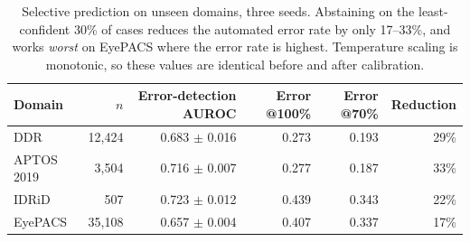 \begin{table}[t]
\centering
\caption{Selective prediction on unseen domains, three seeds. Abstaining on the least-confident 30\% of cases reduces the automated error rate by only 17--33\%, and works \emph{worst} on EyePACS where the error rate is highest. Temperature scaling is monotonic, so these values are identical before and after calibration.}
\label{tab:selective}
\begin{tabular}{lrrrrr}
\toprule
Domain & $n$ & Error-detection AUROC & Error @100\% & Error @70\% & Reduction \\
\midrule
DDR & 12,424 & 0.683 $\pm$ 0.016 & 0.273 & 0.193 & 29\% \\
APTOS 2019 & 3,504 & 0.716 $\pm$ 0.007 & 0.277 & 0.187 & 33\% \\
IDRiD & 507 & 0.723 $\pm$ 0.012 & 0.439 & 0.343 & 22\% \\
EyePACS & 35,108 & 0.657 $\pm$ 0.004 & 0.407 & 0.337 & 17\% \\
\bottomrule
\end{tabular}
\end{table}